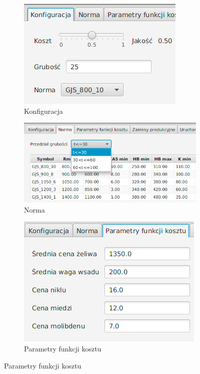 \begin{figure}
    \begin{subfigure}[b]{0.3\textwidth}
        \centering
        \includegraphics[scale=0.6]{images/conf.png}
        \caption {
            Konfiguracja
        }
        \label{fig:conf}
    \end{subfigure}
   \hfill
    \begin{subfigure}[b]{0.7\textwidth}
    	\centering
    	\includegraphics[scale=0.6]{images/norm.png}
    	\caption {
    		 Norma
    	}
    	\label{fig:norm}
    \end{subfigure}
    \vfill
    \begin{subfigure}[b]{0.3\textwidth}
    	\centering
    	\includegraphics[scale=0.6]{images/cost.png}
    	\caption {
    		 Parametry funkcji kosztu
    	}
	    \label{fig:cost-tab}

\end{subfigure}
\end{figure}
